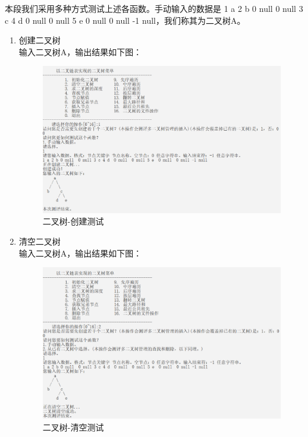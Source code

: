\documentclass[supercite]{Experimental_Report}
\theoremstyle{definition}
\begin{document}
本段我们采用多种方式测试上述各函数。手动输入的数据是
1 a 2 b 0 null  0 null 3 c 4 d  0 null  0 null 5 e  0 null  0 null -1 null，我们称其为二叉树A。
\begin{enumerate}
	\item 创建二叉树\\
	输入二叉树A，输出结果如下图：
		\begin{figure}[htb]
			\begin{center}
				\includegraphics[scale=0.50]{images/二叉树-创建.png}
				\caption{二叉树-创建测试}
				\label{fig2-1}
			\end{center}
		\end{figure}
	\item 清空二叉树\\
	输入二叉树A，输出结果如下图：
		\begin{figure}[htb]
			\begin{center}
				\includegraphics[scale=0.50]{images/二叉树-清空.png}
				\caption{二叉树-清空测试}
				\label{fig2-2}

\end{center}
\end{figure}
\end{enumerate}
\end{document}
